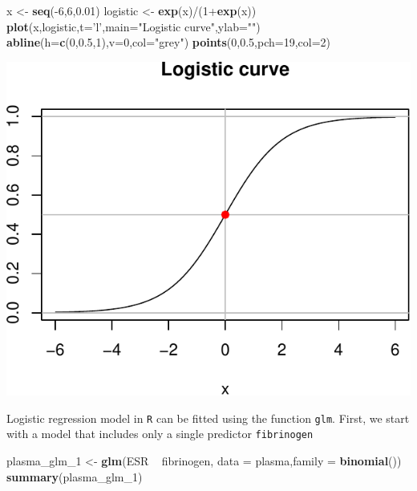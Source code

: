\documentclass[]{article}
\newenvironment{Shaded}{\begin{snugshade}}{\end{snugshade}}
\newcommand{\KeywordTok}[1]{\textcolor[rgb]{0.13,0.29,0.53}{\textbf{{#1}}}}
\newcommand{\DataTypeTok}[1]{\textcolor[rgb]{0.13,0.29,0.53}{{#1}}}
\newcommand{\DecValTok}[1]{\textcolor[rgb]{0.00,0.00,0.81}{{#1}}}
\newcommand{\FloatTok}[1]{\textcolor[rgb]{0.00,0.00,0.81}{{#1}}}
\newcommand{\StringTok}[1]{\textcolor[rgb]{0.31,0.60,0.02}{{#1}}}
\newcommand{\NormalTok}[1]{{#1}}
\numberwithin{equation}{section}
\begin{document}
\begin{Shaded}
\begin{Highlighting}[]
\NormalTok{x <-}\StringTok{ }\KeywordTok{seq}\NormalTok{(-}\DecValTok{6}\NormalTok{,}\DecValTok{6}\NormalTok{,}\FloatTok{0.01}\NormalTok{)}
\NormalTok{logistic <-}\StringTok{ }\KeywordTok{exp}\NormalTok{(x)/(}\DecValTok{1}\NormalTok{+}\KeywordTok{exp}\NormalTok{(x))}
\KeywordTok{plot}\NormalTok{(x,logistic,}\DataTypeTok{t=}\StringTok{'l'}\NormalTok{,}\DataTypeTok{main=}\StringTok{"Logistic curve"}\NormalTok{,}\DataTypeTok{ylab=}\StringTok{""}\NormalTok{)}
\KeywordTok{abline}\NormalTok{(}\DataTypeTok{h=}\KeywordTok{c}\NormalTok{(}\DecValTok{0}\NormalTok{,}\FloatTok{0.5}\NormalTok{,}\DecValTok{1}\NormalTok{),}\DataTypeTok{v=}\DecValTok{0}\NormalTok{,}\DataTypeTok{col=}\StringTok{"grey"}\NormalTok{)}
\KeywordTok{points}\NormalTok{(}\DecValTok{0}\NormalTok{,}\FloatTok{0.5}\NormalTok{,}\DataTypeTok{pch=}\DecValTok{19}\NormalTok{,}\DataTypeTok{col=}\DecValTok{2}\NormalTok{)}
\end{Highlighting}
\end{Shaded}

\includegraphics{index_files/figure-latex/unnamed-chunk-227-1.pdf}

Logistic regression model in \texttt{R} can be fitted using the function
\texttt{glm}. First, we start with a model that includes only a single
predictor \texttt{fibrinogen}

\begin{Shaded}
\begin{Highlighting}[]
\NormalTok{plasma_glm_1 <-}\StringTok{ }\KeywordTok{glm}\NormalTok{(ESR ~}\StringTok{ }\NormalTok{fibrinogen, }\DataTypeTok{data =} \NormalTok{plasma,}\DataTypeTok{family =} \KeywordTok{binomial}\NormalTok{())}
\KeywordTok{summary}\NormalTok{(plasma_glm_1)}
\end{Highlighting}
\end{Shaded}
\end{document}
